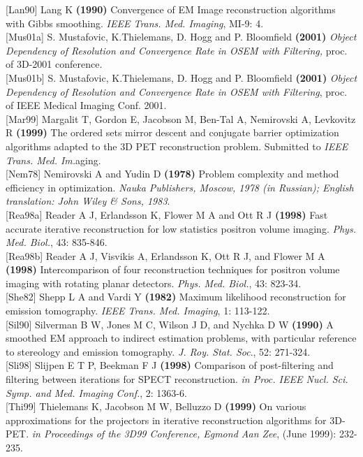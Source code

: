 \documentclass{article}
\begin{document}
{[}Lan90{]} Lang K \textbf{(1990)} Convergence of EM Image reconstruction 
algorithms with Gibbs smoothing. \textit{IEEE Trans. Med. Imaging}, 
MI-9: 4.\\
{[}Mus01a{]} S. Mustafovic, K.Thielemans, D. Hogg and P. Bloomfield \textbf{(2001)} 
\textit{Object Dependency of Resolution and Convergence Rate in OSEM 
with Filtering,} proc. of 3D-2001 conference.\\
{[}Mus01b{]} S. Mustafovic, K.Thielemans, D. Hogg and P. Bloomfield \textbf{(2001)} \textit{Object 
Dependency of Resolution and Convergence Rate in OSEM with Filtering}, 
proc. of IEEE Medical Imaging Conf. 2001.\\
{[}Mar99{]} Margalit T, Gordon E, Jacobson M, Ben-Tal A, Nemirovski 
A, Levkovitz R \textbf{(1999)} The ordered sets mirror descent and 
conjugate barrier optimization algorithms adapted to the 3D PET 
reconstruction problem. Submitted to \textit{IEEE Trans. Med. Im.}aging.\\
{[}Nem78{]} Nemirovski A and Yudin D \textbf{(1978)} Problem complexity 
and method efficiency in optimization. \textit{Nauka Publishers, 
Moscow, 1978 (in Russian); English translation: John Wiley \& 
Sons, 1983}.\\
{[}Rea98a{]} Reader A J, Erlandsson K, Flower M A and Ott R J \textbf{(1998)} 
Fast accurate iterative reconstruction for low statistics positron 
volume imaging. \textit{Phys. Med. Biol.}, 43: 835-846.\\
{[}Rea98b{]} Reader A J, Visvikis A, Erlandsson K, Ott R J, and Flower 
M A \textbf{(1998)} Intercomparison of four reconstruction techniques 
for positron volume imaging with rotating planar detectors. \textit{Phys. 
Med. Biol.}, 43: 823-34.\\
{[}She82{]} Shepp L A and Vardi Y \textbf{(1982)} Maximum likelihood reconstruction 
for emission tomography. \textit{IEEE Trans. Med. Imaging}, 1: 113-122.\\
{[}Sil90{]} Silverman B W, Jones M C, Wilson J D, and Nychka D W \textbf{(1990)} 
A smoothed EM approach to indirect estimation problems, with 
particular reference to stereology and emission tomography. \textit{J. 
Roy. Stat. Soc}., 52: 271-324.\\
{[}Sli98{]} Slijpen E T P, Beekman F J \textbf{(1998)} Comparison of post-filtering 
and filtering between iterations for SPECT reconstruction. \textit{in 
Proc. IEEE Nucl. Sci. Symp. and Med. Imaging Conf.}, 2: 1363-6.\\
{[}Thi99{]} Thielemans K, Jacobson M W, Belluzzo D \textbf{(1999)} On 
various approximations for the projectors in iterative reconstruction 
algorithms for 3D-PET. \textit{in Proceedings of the 3D99 Conference, 
Egmond Aan Zee}, (June 1999): 232-235.
\end{document}
